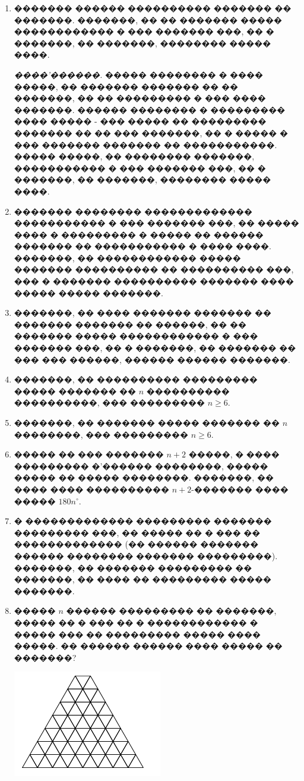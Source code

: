 \documentclass[a4paper,12pt]{article}
\begin{document}
\begin{enumerate}
\item ������� ������ ���������� ������� �� �������. �������, �� �� ������� ����� ������������ � ��� ������� ���, �� � �������, �� �������, �������� ����� ����.

\textit{����'������.} ����� �������� � ���� �����, �� ������� ������� �� �� �������, �� �� ��������� � ��� ���� �������. ������ �������� � ��������� ���� ����� - ��� ����� �� ��������� ������� �� �� ��� �������, �� � ����� � ��� ������� ������� �� �����������. ����� �����, �� �������� �������, ����������� � ��� ������� ���, �� � �������, �� �������, �������� ����� ����.

\item ������� �������� ������������� ����������� � ��� ������� ���, �� ����� ���� � ��������� � ����� �� ������ ������� �� ����������� � ���� ����. �������, �� ������������ ����� ������� ���������� �� ���������� ���, ��� � ������� ���������� ������� ���� ����� ����� �������.

\item �������, �� ���� ������� ������� �� ������� ������� �� ������, �� �� ������� ����� ������������ � ��� ������� ���, �� � �������, �� ������� �� ��� ��� ������, ������ ������ �������.

\item �������, �� ���������� ��������� ����� ������� �� $n$ ���������� ����������, ��� ��������� $n\geq 6$.

\item �������, �� ������� ����� ������� �� $n$ ��������, ��� ��������� $n\geq 6$.

\item ����� �� ��� ������� $n+2$ �����, � ���� ��������� �'������ ��������, ����� ����� �� ����� ��������. �������, �� ���� ���� ���������� $n+2$-������� ���� ����� $180n^{\circ}$.

\item � ������������� ��������� ������� ��������� ���, �� ����� �� � ��� �� ������������� (�� ������ ������� ������ �������� ������� ���������). �������, �� ������� ��������� �� �������, �� ���� �� ��������� ����� �������.

\item ����� $n$ ������ ��������� �� �������, ����� �� � ��� �� � ������������ � ����� ��� �� ��������� ����� ���� �����. �� ������ ������ ���� ����� �� �������?


\begin{minipage}{.35\textwidth}
\begin{center}
\includegraphics[scale=0.4]{tr1.png}
\end{center}


\end{minipage}
\end{enumerate}
\end{document}
